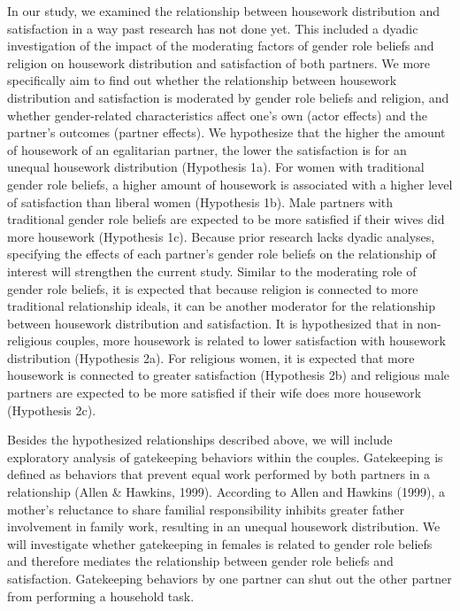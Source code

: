 \documentclass[
  man,floatsintext]{apa6}
\begin{document}
In our study, we examined the relationship between housework distribution and satisfaction in a way past research has not done yet. This included a dyadic investigation of the impact of the moderating factors of gender role beliefs and religion on housework distribution and satisfaction of both partners. We more specifically aim to find out whether the relationship between housework distribution and satisfaction is moderated by gender role beliefs and religion, and whether gender-related characteristics affect one's own (actor effects) and the partner's outcomes (partner effects).
We hypothesize that the higher the amount of housework of an egalitarian partner, the lower the satisfaction is for an unequal housework distribution (Hypothesis 1a). For women with traditional gender role beliefs, a higher amount of housework is associated with a higher level of satisfaction than liberal women (Hypothesis 1b). Male partners with traditional gender role beliefs are expected to be more satisfied if their wives did more housework (Hypothesis 1c). Because prior research lacks dyadic analyses, specifying the effects of each partner's gender role beliefs on the relationship of interest will strengthen the current study. Similar to the moderating role of gender role beliefs, it is expected that because religion is connected to more traditional relationship ideals, it can be another moderator for the relationship between housework distribution and satisfaction. It is hypothesized that in non-religious couples, more housework is related to lower satisfaction with housework distribution (Hypothesis 2a). For religious women, it is expected that more housework is connected to greater satisfaction (Hypothesis 2b) and religious male partners are expected to be more satisfied if their wife does more housework (Hypothesis 2c).

Besides the hypothesized relationships described above, we will include exploratory analysis of gatekeeping behaviors within the couples. Gatekeeping is defined as behaviors that prevent equal work performed by both partners in a relationship (Allen \& Hawkins, 1999). According to Allen and Hawkins (1999), a mother's reluctance to share familial responsibility inhibits greater father involvement in family work, resulting in an unequal housework distribution. We will investigate whether gatekeeping in females is related to gender role beliefs and therefore mediates the relationship between gender role beliefs and satisfaction. Gatekeeping behaviors by one partner can shut out the other partner from performing a household task.
\end{document}

